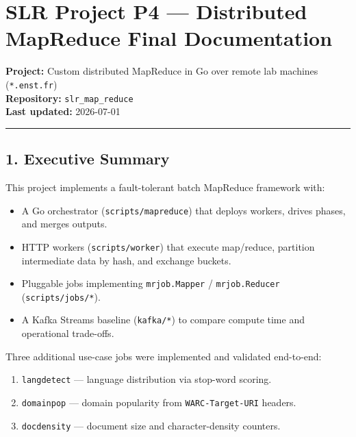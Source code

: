 \documentclass[
]{article}
\author{}
\date{}
\providecommand{\tightlist}{%
  \setlength{\itemsep}{0pt}\setlength{\parskip}{0pt}}
\begin{document}
\section{SLR Project P4 --- Distributed MapReduce Final
Documentation}\label{slr-project-p4-distributed-mapreduce-final-documentation}

\textbf{Project:} Custom distributed MapReduce in Go over remote lab
machines (\texttt{*.enst.fr})\\
\textbf{Repository:} \texttt{slr\_map\_reduce}\\
\textbf{Last updated:} 2026-07-01

\begin{center}\rule{0.5\linewidth}{0.5pt}\end{center}

\subsection{1. Executive Summary}\label{executive-summary}

This project implements a fault-tolerant batch MapReduce framework with:

\begin{itemize}
\tightlist
\item
  A Go orchestrator (\texttt{scripts/mapreduce}) that deploys workers,
  drives phases, and merges outputs.
\item
  HTTP workers (\texttt{scripts/worker}) that execute map/reduce,
  partition intermediate data by hash, and exchange buckets.
\item
  Pluggable jobs implementing \texttt{mrjob.Mapper} /
  \texttt{mrjob.Reducer} (\texttt{scripts/jobs/*}).
\item
  A Kafka Streams baseline (\texttt{kafka/*}) to compare compute time
  and operational trade-offs.
\end{itemize}

Three additional use-case jobs were implemented and validated
end-to-end:

\begin{enumerate}
\def\labelenumi{\arabic{enumi}.}
\tightlist
\item
  \texttt{langdetect} --- language distribution via stop-word scoring.
\item
  \texttt{domainpop} --- domain popularity from \texttt{WARC-Target-URI}
  headers.
\item
  \texttt{docdensity} --- document size and character-density counters.
\end{enumerate}
\end{document}
